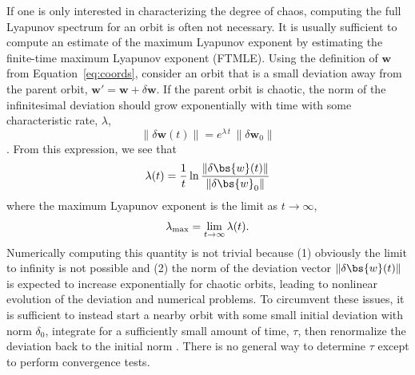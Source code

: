 If one is only interested in characterizing the degree of chaos, computing the full Lyapunov spectrum for an orbit is often not necessary. It is usually sufficient to compute an estimate of the maximum Lyapunov exponent by estimating the finite-time maximum Lyapunov exponent (FTMLE). Using the definition of $\boldsymbol{w}$ from Equation~\ref{eq:coords}, consider an orbit that is a small deviation away from the parent orbit, $\boldsymbol{w}' = \boldsymbol{w} + \delta\boldsymbol{w}$. If the parent orbit is chaotic, the norm of the infinitesimal deviation should grow exponentially with time with some characteristic rate, $\lambda$,
\begin{equation}
	\|\delta\boldsymbol{w}(t)\| = e^{\lambda \, t} \, \|\delta\boldsymbol{w}_0\|
\end{equation}
\citep[see, e.g.,][]{lichtenberg83,tabor89}. From this expression, we see that
\begin{equation}
	\lambda(t) = \frac{1}{t}\ln \frac{\|\delta \bs{w}(t)\|}{\|\delta \bs{w}_0\|} \label{eq:mle}
\end{equation}
where the maximum Lyapunov exponent is the limit as $t\rightarrow \infty$,
\begin{equation}
	\lambda_{\rm max} = \lim_{t\rightarrow\infty}\lambda(t). \label{eq:lmax}
\end{equation}
Numerically computing this quantity is not trivial because (1) obviously the limit to infinity is not possible and (2) the norm of the deviation vector $\|\delta \bs{w}(t)\|$ is expected to increase exponentially for chaotic orbits, leading to nonlinear evolution of the deviation and numerical problems. To circumvent these issues, it is sufficient to instead start a nearby orbit with some small initial deviation with norm $\delta_0$, integrate for a sufficiently small amount of time, $\tau$, then renormalize the deviation back to the initial norm \citep{benettin76}. There is no general way to determine $\tau$ except to perform convergence tests.
